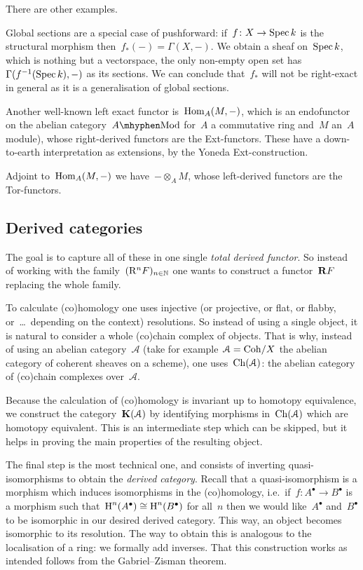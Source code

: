 \documentclass[10pt,a4paper]{article}
\begin{document}
There are other examples.
\begin{example}
  \label{example:global-sections-pushforward}
  Global sections are a special case of pushforward: if~$f\colon X\to\operatorname{Spec} k$ is the structural morphism then~$f_*(-)=\Gamma(X,-)$. We obtain a sheaf on~$\operatorname{Spec} k$, which is nothing but a vectorspace, the only non-empty open set has~$\Gamma(f^{-1}(\operatorname{Spec} k),-)$ as its sections. We can conclude that~$f_*$ will not be right-exact in general as it is a generalisation of global sections.
\end{example}
\begin{example}
  Another well-known left exact functor is~$\operatorname{Hom}_A(M,-)$, which is an endofunctor on the abelian category~$A\mhyphen\mathrm{Mod}$ for~$A$ a commutative ring and~$M$ an~$A$\dash module), whose right-derived functors are the Ext-functors. These have a down-to-earth interpretation as extensions, by the Yoneda Ext-construction.
\end{example}
\begin{example}
  Adjoint to~$\operatorname{Hom}_A(M,-)$ we have~$-\otimes_AM$, whose left-derived functors are the Tor-functors.
\end{example}

\subsection{Derived categories}
The goal is to capture all of these in one single \emph{total derived functor}. So instead of working with the family~$(\mathrm{R}^nF)_{n\in\mathbb{N}}$ one wants to construct a functor~$\mathbf{R} F$ replacing the whole family.

To calculate (co)homology one uses injective (or projective, or flat, or flabby, or~\dots\ depending on the context) resolutions. So instead of using a single object, it is natural to consider a whole (co)chain complex of objects. That is why, instead of using an abelian category~$\mathcal{A}$ (take for example~$\mathcal{A}=\mathrm{Coh}/X$ the abelian category of coherent sheaves on a scheme), one uses~$\operatorname{Ch}(\mathcal{A})$: the abelian category of (co)chain complexes over~$\mathcal{A}$.

Because the calculation of (co)homology is invariant up to homotopy equivalence, we construct the category~$\mathbf{K}(\mathcal{A})$ by identifying morphisms in~$\operatorname{Ch}(\mathcal{A})$ which are homotopy equivalent. This is an intermediate step which can be skipped, but it helps in proving the main properties of the resulting object.

The final step is the most technical one, and consists of inverting quasi-isomorphisms to obtain the \emph{derived category}. Recall that a quasi-isomorphism is a morphism which induces isomorphisms in the (co)homology, i.e.\ if~$f\colon A^\bullet\to B^\bullet$ is a morphism such that~$\operatorname{H}^n(A^\bullet)\cong\operatorname{H}^n(B^\bullet)$ for all~$n$ then we would like~$A^\bullet$ and~$B^\bullet$ to be isomorphic in our desired derived category. This way, an object becomes isomorphic to its resolution. The way to obtain this is analogous to the localisation of a ring: we formally add inverses. That this construction works as intended follows from the Gabriel--Zisman theorem.
\end{document}
